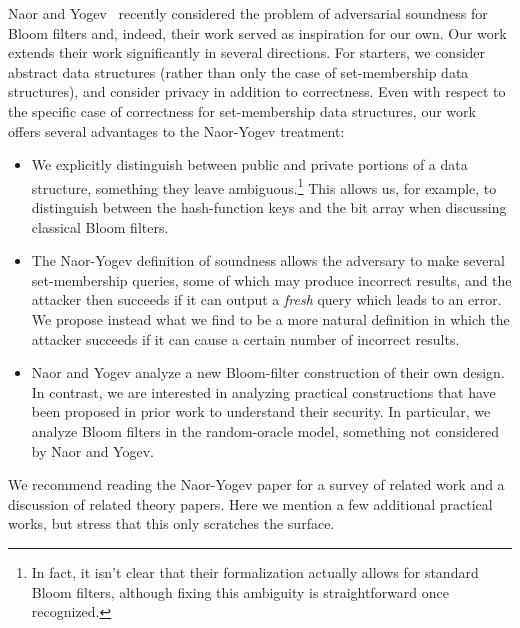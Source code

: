 Naor and Yogev~\cite{C:NaoYog15} recently considered the problem of
adversarial soundness for Bloom filters and, indeed, their work
served as inspiration for our own. Our work extends their work
significantly in several directions. For starters, we consider
abstract data structures (rather than only the case of
set-membership data structures), and consider privacy in addition to
correctness. Even with respect to the specific case of correctness
for set-membership data structures, our work offers several
advantages to the Naor-Yogev treatment:
\begin{itemize}
\item We explicitly distinguish between public and private
    portions of a data structure, something they leave
    ambiguous.\footnote{In fact, it isn't clear that their
formalization actually allows for standard Bloom filters,
    although fixing this ambiguity is straightforward once
    recognized.} This allows us, for example, to distinguish
    between the hash-function keys and the bit array when
    discussing classical Bloom filters.
\item The Naor-Yogev definition of soundness allows the
    adversary to make several set-membership queries, some of
    which may produce incorrect results, and the attacker then
    succeeds if it can output a \emph{fresh} query which leads
    to an error. We propose instead what we find to be a more
    natural definition in which the attacker succeeds if it can
    cause a certain number of incorrect results.
\item Naor and Yogev analyze a new Bloom-filter construction of
    their own design. In contrast, we are interested in
    analyzing practical constructions that have been proposed in
    prior work to understand their security. In particular, we
    analyze Bloom filters in the random-oracle model, something
    not considered by Naor and Yogev.
\end{itemize}



We recommend reading the Naor-Yogev paper for a survey of related
work and a discussion of related theory papers. Here we mention a
few additional practical works, but stress that this only scratches
the surface.

